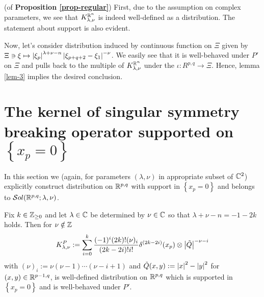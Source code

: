 \documentclass[10pt]{article} %
\theoremstyle{definition}
\theoremstyle{remark}
\begin{document}
\begin{myproof}(of {\bf Proposition \ref{prop-regular}})\newline
	First, due to the assumption on complex parameters, we see that $K_{ \lambda,\nu }^{ \mathbb{R}^n }$ is indeed well-defined as a
	distribution. The statement about support is also evident.\par
	Now, let's consider distribution induced by continuous function on $\Xi$ given by
	$\Xi\ni\xi\mapsto\left|\xi_p\right|^{\lambda+\nu-n}\left|\xi_{p+q+2}-\xi_1\right|^{-\nu}$. We easily see that 
	it is well-behaved under $P'$ on $\Xi$ and pulls back to the multiple of $K_{ \lambda,\nu }^{ \mathbb{R}^n }$
	under the $\iota:R^{p,q}\to\Xi$. Hence,
	lemma \ref{lem-3} implies the desired conclusion.
\end{myproof}
\section{The kernel of singular symmetry breaking operator supported on $\left\{ x_p=0 \right\}$}
In this section we (again, for parameters $(\lambda,\nu)$ in appropriate subset of $\mathbb{C}^2$)
explicitly construct distribution on $\mathbb{R}^{p,q}$ with support in $\left\{ x_p=0 \right\}$ and belongs to $\mathcal{S}ol(\mathbb{R}^{p,q};\lambda,\nu)$.
\begin{myprop}
	Fix $k\in\mathbb{Z}_{\ge0}$ and let $\lambda\in\mathbb{C}$ be determined by $\nu\in\mathbb{C}$ so that $\lambda+\nu-n=-1-2k$ holds.
	Then for $\nu\notin\mathbb{Z}$
	\[K_{\lambda,\nu}^P:=\sum_{i=0}^k\frac{(-1)^i(2k)!(\nu)_i}{(2k-2i)!i!}
	\delta^{(2k-2i)}(x_p)\otimes\myabs{\tilde{Q}}^{-\nu-i}
	\] with $(\nu)_i:=\nu(\nu-1)\cdots(\nu-i+1)$ and $\tilde{Q}(x,y):=\left|x\right|^2-\left|y\right|^2$ for $(x,y)\in\mathbb{R}^{p-1,q}$,
	is well-defined distribution on $\mathbb{R}^{p,q}$ which is supported in $\left\{ x_p=0 \right\}$ and is well-behaved
	under $P'$.
\end{myprop}
\end{document}
